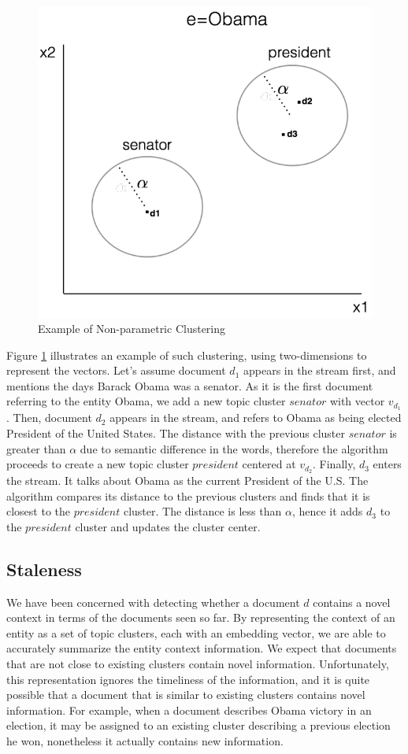 \documentclass{article}
\begin{document}
\begin{figure}[tb]
\centering
\includegraphics[width=0.7\columnwidth]{fig/obamaExample.pdf}
\caption{Example of Non-parametric Clustering}
\label{obama}
\end{figure}

Figure \ref{obama} illustrates an example of such clustering, using two-dimensions to represent the vectors.
Let's assume document $d_1$ appears in the stream first, and mentions the days Barack Obama was a senator. As it is the first document referring to the entity Obama, we add a new topic cluster $senator$ with vector $v_{d_1}$. 
Then, document $d_2$ appears in the stream, and refers to Obama as being elected President of the United States.
The distance with the previous cluster $senator$ is greater than $\alpha$ due to semantic difference in the words, therefore the algorithm proceeds to create a new topic cluster $president$ centered at $v_{d_2}$. 
Finally, $d_3$ enters the stream. 
It talks about Obama as the current President of the U.S. 
The algorithm compares its distance to the previous clusters and finds that it is closest to the $president$ cluster. 
The distance is less than $\alpha$, hence it adds $d_3$ to the $president$ cluster and updates the cluster center. 

\subsection{Staleness}
\label{staleness}

We have been concerned with detecting whether a document $d$ contains a novel context in terms of the documents seen so far.
By representing the context of an entity as a set of topic clusters, each with an embedding vector, we are able to accurately summarize the entity context information. We expect that documents that are not close to existing clusters contain novel information.
Unfortunately, this representation ignores the timeliness of the information, and it is quite possible that a document that is similar to existing clusters contains novel information.
For example, when a document describes Obama victory in an election, it may be assigned to an existing cluster describing a previous election he won, nonetheless it actually contains new information.
\end{document}
